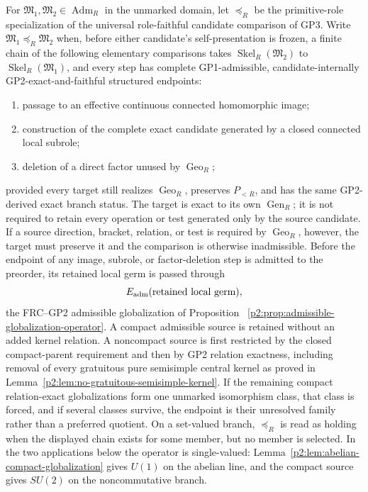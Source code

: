 \documentclass[12pt,a4paper]{article}
\begin{document}
\begin{definition}
\label{p2:def:global-gp3-preorder}
For \(\mathfrak M_1,\mathfrak M_2\in\operatorname{Adm}_R\) in the unmarked
domain, let \(\preceq_R\) be the primitive-role specialization of the universal
role-faithful candidate comparison of GP3.  Write
\(\mathfrak M_1\preceq_R\mathfrak M_2\) when, before either candidate's
self-presentation is frozen, a finite chain of the following elementary
comparisons takes \(\operatorname{Skel}_R(\mathfrak M_2)\) to
\(\operatorname{Skel}_R(\mathfrak M_1)\), and every step has complete
GP1-admissible, candidate-internally GP2-exact-and-faithful structured
endpoints:
\begin{enumerate}[label=(\roman*),leftmargin=2em]
\item passage to an effective continuous connected homomorphic image;
\item construction of the complete exact candidate generated by a closed
connected local subrole;
\item deletion of a direct factor unused by \(\operatorname{Geo}_R\);
\end{enumerate}
provided every target still realizes \(\operatorname{Geo}_R\), preserves
\(P_{<R}\), and has the same GP2-derived exact branch status.  The target is
exact to its own \(\operatorname{Gen}_R\); it is not required to retain every
operation or test generated only by the source candidate.  If a source
direction, bracket, relation, or test is required by \(\operatorname{Geo}_R\),
however, the target must preserve it and the comparison is otherwise
inadmissible.  Before the endpoint of any image, subrole, or factor-deletion
step is admitted to the preorder, its retained local germ is passed through
\[
        E_{\rm adm}(\text{retained local germ}),
\]
the FRC--GP2 admissible globalization of Proposition~
\ref{p2:prop:admissible-globalization-operator}.  A compact admissible source
is retained without an added kernel relation.  A noncompact source is first
restricted by the closed compact-parent requirement and then by GP2 relation
exactness, including removal of every gratuitous pure semisimple central
kernel as proved in
Lemma~\ref{p2:lem:no-gratuitous-semisimple-kernel}.  If the remaining compact
relation-exact globalizations form one unmarked isomorphism class, that class
is forced, and if several classes survive, the endpoint is their unresolved
family rather than a preferred quotient.  On a set-valued branch, \(\preceq_R\) is read as
holding when the displayed chain exists for some member, but no member is
selected.  In the two applications below the operator is single-valued:
Lemma~\ref{p2:lem:abelian-compact-globalization} gives \(U(1)\) on the abelian
line, and the compact source gives \(SU(2)\) on the noncommutative branch.


\end{definition}
\end{document}
